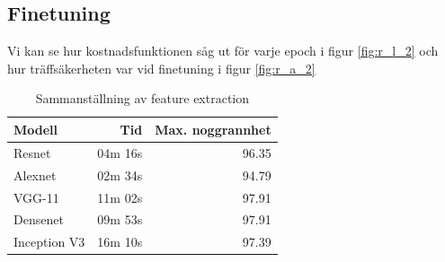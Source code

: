 \documentclass[]{kththesis}
\begin{document}
\subsection{Finetuning}
Vi kan se hur kostnadsfunktionen såg ut för varje epoch i figur \ref{fig:r_l_2} och hur träffsäkerheten var vid finetuning i figur \ref{fig:r_a_2}

\begin{table}
  \centering
  \begin{tabular}{|l|r|r|}
    Modell & Tid & Max. noggrannhet \\ 
    \hline
    Resnet       & 04m 16s & 96.35 \\
    Alexnet      & 02m 34s & 94.79 \\
    VGG-11       & 11m 02s & 97.91 \\
    Densenet     & 09m 53s & 97.91 \\
    Inception V3 & 16m 10s & 97.39 \\
  \end{tabular}
  \caption{Sammanställning av feature extraction}
\end{table}
\end{document}
